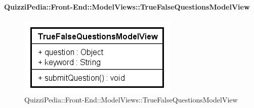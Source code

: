 \paragraph{QuizziPedia::Front-End::ModelViews::TrueFalseQuestionsModelView}
\begin{figure} [ht]
	\centering
	\includegraphics[scale=0.80]{UML/Classi/Front-End/QuizziPedia_Front-end_ModelView_TrueFalseQuestionsModelView.png}
	\caption{QuizziPedia::Front-End::ModelViews::TrueFalseQuestionsModelView}
\end{figure} \FloatBarrier
